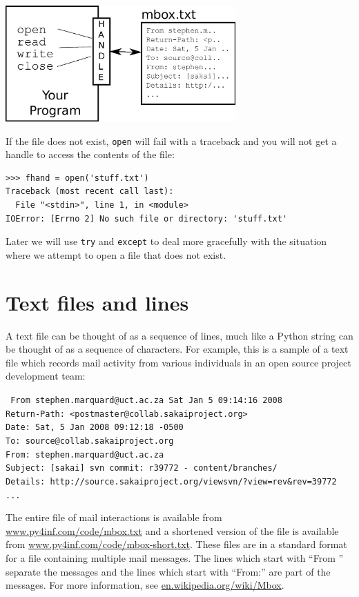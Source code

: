 \documentclass[10pt]{book}
\begin{document}
\beforefig
\centerline{\includegraphics[height=1.75in]{figs2/handle.eps}}
\afterfig

If the file does not exist, {\tt open} will fail with a traceback and you 
will not get a handle to access the contents of the file:

\beforeverb
\begin{verbatim}
>>> fhand = open('stuff.txt')
Traceback (most recent call last):
  File "<stdin>", line 1, in <module>
IOError: [Errno 2] No such file or directory: 'stuff.txt'
\end{verbatim}
\afterverb
%
Later we will use {\tt try} and {\tt except} to deal more gracefully
with the situation where we attempt to open a file that does 
not exist.

\section{Text files and lines}

A text file can be thought of as a sequence of lines, much like a Python
string can be thought of as a sequence of characters.  For example, this
is a sample of a text file which records mail activity from various
individuals in an open source project development team:

{\tt
From stephen.marquard@uct.ac.za Sat Jan  5 09:14:16 2008\\
Return-Path: <postmaster@collab.sakaiproject.org>\\
Date: Sat, 5 Jan 2008 09:12:18 -0500\\
To: source@collab.sakaiproject.org\\
From: stephen.marquard@uct.ac.za\\
Subject: [sakai] svn commit: r39772 - content/branches/\\
Details: http://source.sakaiproject.org/viewsvn/?view=rev\&rev=39772\\
...
}

The entire file of mail interactions is available from 
\url{www.py4inf.com/code/mbox.txt} 
and a shortened version of the file is available from
\url{www.py4inf.com/code/mbox-short.txt}.
These files are in a standard format for a file containing 
multiple mail messages. The lines which start with 
``From '' separate the messages and the lines which start 
with ``From:'' are part of the messages. 
For more information, see 
\url{en.wikipedia.org/wiki/Mbox}. 
\end{document}

